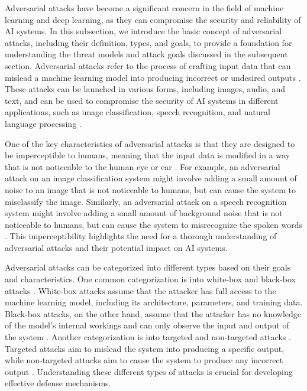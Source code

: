 \documentclass[11pt]{article}
\begin{document}
Adversarial attacks have become a significant concern in the field of machine learning and deep learning, as they can compromise the security and reliability of AI systems. In this subsection, we introduce the basic concept of adversarial attacks, including their definition, types, and goals, to provide a foundation for understanding the threat models and attack goals discussed in the subsequent section. Adversarial attacks refer to the process of crafting input data that can mislead a machine learning model into producing incorrect or undesired outputs \cite{ref25}. These attacks can be launched in various forms, including images, audio, and text, and can be used to compromise the security of AI systems in different applications, such as image classification, speech recognition, and natural language processing \cite{ref26}.

One of the key characteristics of adversarial attacks is that they are designed to be imperceptible to humans, meaning that the input data is modified in a way that is not noticeable to the human eye or ear \cite{ref27}. For example, an adversarial attack on an image classification system might involve adding a small amount of noise to an image that is not noticeable to humans, but can cause the system to misclassify the image. Similarly, an adversarial attack on a speech recognition system might involve adding a small amount of background noise that is not noticeable to humans, but can cause the system to misrecognize the spoken words \cite{ref28}. This imperceptibility highlights the need for a thorough understanding of adversarial attacks and their potential impact on AI systems.

Adversarial attacks can be categorized into different types based on their goals and characteristics. One common categorization is into white-box and black-box attacks \cite{ref29}. White-box attacks assume that the attacker has full access to the machine learning model, including its architecture, parameters, and training data. Black-box attacks, on the other hand, assume that the attacker has no knowledge of the model's internal workings and can only observe the input and output of the system \cite{ref30}. Another categorization is into targeted and non-targeted attacks \cite{ref30}. Targeted attacks aim to mislead the system into producing a specific output, while non-targeted attacks aim to cause the system to produce any incorrect output \cite{ref31}. Understanding these different types of attacks is crucial for developing effective defense mechanisms.
\end{document}
